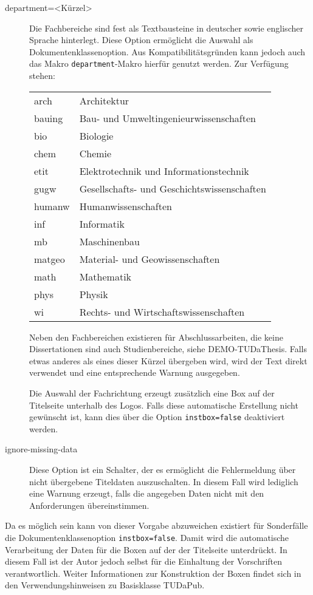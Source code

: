 \documentclass[
	ngerman,
	ruledheaders=chapter,%
	class=book,%
	thesis={
		type=dr,
		dr=rernat
	},
	accentcolor=9c,%
	custommargins=true,%
	marginpar=false,%
	parskip=half-,%
	fontsize=11pt,%
]{tudapub}
\let\code\texttt
\begin{document}
\begin{description}
	\item[department=<Kürzel>] Die Fachbereiche sind fest als Textbausteine in deutscher sowie englischer Sprache hinterlegt. Diese Option ermöglicht die Auswahl als Dokumentenklassenoption. Aus Kompatibilitätsgründen kann jedoch auch das Makro \code{department}-Makro hierfür genutzt werden. Zur Verfügung stehen:\par
\begin{tabular}{@{}l@{${}\to{}$}l@{}}
	arch  & Architektur\\
	bauing& Bau- und Umweltingenieurwissenschaften\\
	bio   &Biologie\\
	chem  &Chemie\\
	etit  &Elektrotechnik und Informationstechnik\\
	gugw  &Gesellschafts- und Geschichtswissenschaften\\
	humanw&Humanwissenschaften\\
	inf   &Informatik\\
	mb    &Maschinenbau\\
	matgeo&Material- und Geowissenschaften\\
	math  &Mathematik\\
	phys  &Physik\\
	wi    &Rechts- und Wirtschaftswissenschaften
\end{tabular}
	
Neben den Fachbereichen existieren für Abschlussarbeiten, die keine Dissertationen sind auch Studienbereiche, siehe DEMO-TUDaThesis.
Falls etwas anderes als eines dieser Kürzel übergeben wird, wird der Text direkt verwendet und eine entsprechende Warnung ausgegeben.

Die Auswahl der Fachrichtung erzeugt zusätzlich eine Box auf der Titelseite unterhalb des Logos. Falls diese automatische Erstellung nicht gewünscht ist, kann dies über die Option \code{instbox=false} deaktiviert werden.
\item[ignore-missing-data] Diese Option ist ein Schalter, der es ermöglicht die Fehlermeldung über nicht übergebene Titeldaten auszuschalten. In diesem Fall wird lediglich eine Warnung erzeugt, falls die angegeben Daten nicht mit den Anforderungen übereinstimmen.
\end{description}

Da es möglich sein kann von dieser Vorgabe abzuweichen existiert für Sonderfälle die Dokumentenklassenoption \code{instbox=false}. Damit wird die automatische Verarbeitung der Daten für die Boxen auf der der Titelseite unterdrückt. In diesem Fall ist der Autor jedoch selbst für die Einhaltung der Vorschriften verantwortlich. Weiter Informationen zur Konstruktion der Boxen findet sich in den Verwendungshinweisen zu Basisklasse TUDaPub.

\printbibliography
\end{document}
